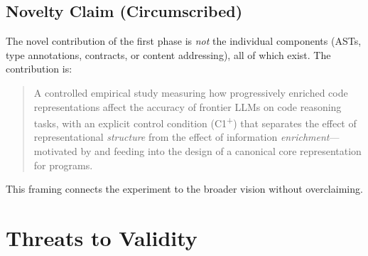 \documentclass[11pt]{article}
\begin{document}
\subsection*{Novelty Claim (Circumscribed)}

The novel contribution of the first phase is \emph{not} the
individual components (ASTs, type annotations, contracts, or content
addressing), all of which exist.  The contribution is:
\begin{quote}
  A controlled empirical study measuring how progressively enriched
  code representations affect the accuracy of frontier LLMs on code
  reasoning tasks, with an explicit control condition
  (C1\textsuperscript{+}) that separates the effect of
  representational \emph{structure} from the effect of information
  \emph{enrichment}---motivated by and feeding into the design of a
  canonical core representation for programs.
\end{quote}
This framing connects the experiment to the broader vision without
overclaiming.


\section{Threats to Validity}
\label{sec:threats}
\end{document}
